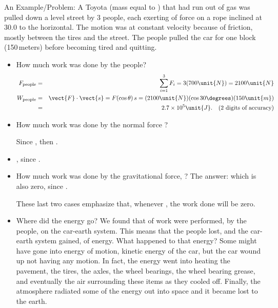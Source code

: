 {

 An Example/Problem:
A Toyota (mass equal to ) that had run out of gas was
pulled down a level street by 3 people, each exerting  of
force on a rope inclined at {30.0\degrees} to the horizontal.
The motion was at constant velocity because of friction, mostly between the
tires and the street.
The people pulled the car for one block (150\,\unit{meters}) before becoming tired
and quitting.
%
\begin{itemize}
\item How much work was done by the people?
\begin{eqnarray*}
F_\text{people} & = & \sum_{i=1}^3 F_i = 3(700\unit{N}) = 2100\unit{N} \\
W_\text{people} & = & \vect{F} \cdot \vect{s} = F (\cos\theta)\,s =
                      (2100\unit{N})(\cos30\degrees) (150\unit{m}) \\
                & = & 2.7 \times 10^5\unit{J}. \quad \text{(2 digits of accuracy)}
\end{eqnarray*}
\item How much work was done by the normal force ?

Since , then .

\item[] , since .
\end{itemize}
\begin{itemize}
\item How much work was done by the gravitational force, ?\newline
The answer:
 which is also zero, since .

These last two cases emphasize that, whenever \m{\theta = 90\degrees}, the work done will be zero.

\item Where did the energy go?
We found that  of work were performed, by the people,
on the car-earth system.
This means that the people lost, and the car-earth system gained,
 of energy.
What happened to that energy?
Some might have gone into energy of motion, kinetic energy of the car, but
the car wound up not having any motion.
In fact, the energy went into heating the pavement, the tires, the axles,
the wheel bearings, the wheel bearing grease, and eventually the air
surrounding these items as they cooled off.
Finally, the atmosphere radiated some of the energy out into space and it
became lost to the earth.
\end{itemize}

}
